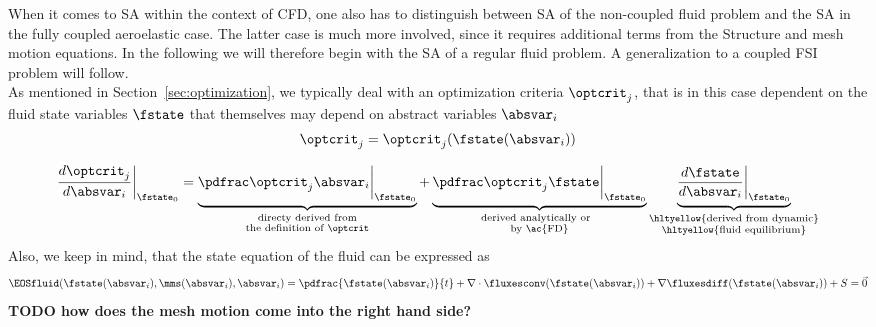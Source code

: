 \documentclass[../main.tex]{subfiles}
\begin{document}
When it comes to \ac{SA} within the context of \ac{CFD}, one also has to distinguish between \ac{SA} of the non-coupled fluid problem and the \ac{SA} in the fully coupled aeroelastic case. The latter case is much more involved, since it requires additional terms from the Structure and mesh motion equations. In the following we will therefore begin with the \ac{SA} of a regular fluid problem. A generalization to a coupled FSI problem will follow.
 \\


As mentioned in Section~\ref{sec:optimization}, we typically deal with an optimization criteria $\optcrit_j$, that is in this case dependent on the fluid state variables $\fstate$ that themselves may depend on abstract variables $\absvar_i$
\begin{align}
\optcrit_j=\optcrit_j(\fstate(\absvar_i))
\end{align}



\begin{align}
\DoptcritJBYabsvarI\bigg\rvert_{\fstate_0}=
\underbrace{\PoptcritJBYabsvarI\bigg\rvert_{\fstate_0}}_{
                                                        \substack{
                                                                 \text{directy derived from} \\
                                                                 \text{the definition of $\optcrit$}
                                                                 } 
                                                        }  +
\underbrace{\PoptcritJBYfstate\bigg\rvert_{\fstate_0}}_ {
                                                        \substack{
                                                                 \text{derived analytically or~~}\\
                                                                 \text{by \ac{FD}}
                                                                 }
                                                        }
\underbrace{\DfstateBYabsvarI\bigg\rvert_{\fstate_0}}_  {
                                                        \substack{
                                                                 \text{\hltyellow{derived from dynamic}}\\
                                                                 \text{\hltyellow{fluid equilibrium}}
                                                                 }
                                                        }
\end{align}
Also, we keep in mind, that the state equation of the fluid can be expressed as
\begin{align}
\EOSfluid(\fstate(\absvar_i),\mms(\absvar_i),\absvar_i)=
\pdfrac{\fstate(\absvar_i)}{t}+\nabla\cdot\fluxesconv(\fstate(\absvar_i))+\nabla\fluxesdiff(\fstate(\absvar_i))+S=
\vec{0}
\end{align}
\textbf{TODO how does the mesh motion come into the right hand side?}
\end{document}
